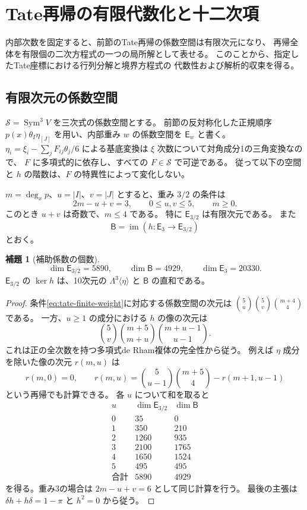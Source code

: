 \documentclass[a4paper,11pt]{ltjsarticle}
\theoremstyle{definition}
\newtheorem{lemma}[theorem]{補題}
\newcommand{\Sym}{\operatorname{Sym}}
\begin{document}
\clearpage
\section{Tate再帰の有限代数化と十二次項}
\label{sec:tate-algebraization-twelfth}
\label{sec:finite-algebraic-tate}

内部次数を固定すると、前節のTate再帰の係数空間は有限次元になり、
再帰全体を有限個の二次方程式の一つの局所解として表せる。
このことから、指定したTate座標における行列分解と境界方程式の
代数性および解析的収束を得る。

\subsection{有限次元の係数空間}

$\mathcal S=\Sym^3V$ を三次式の係数空間とする。
前節の反対称化した正規順序
$p(x)\theta_I\eta_{[J]}$ を用い、内部重み $w$ の係数空間を
$\mathsf E_w$ と書く。
$\eta_i=\xi_i-\sum_jF_{ij}\theta_j/6$ による基底変換は
$\xi$ 次数について対角成分1の三角変換なので、
$F$ に多項式的に依存し、すべての $F\in\mathcal S$ で可逆である。
従って以下の空間と $h$ の階数は、$F$ の特異性によって変化しない。

$m=\deg_xp$、$u=|I|$、$v=|J|$ とすると、重み $3/2$ の条件は
\[
 2m-u+v=3,\qquad 0\le u,v\le5,\qquad m\ge0.
 \tag{A1}\label{eq:tate-finite-weight}
\]
このとき $u+v$ は奇数で、$m\le4$ である。
特に $\mathsf E_{3/2}$ は有限次元である。
また
\[
 \mathsf B=\operatorname{im}
       (h\colon\mathsf E_3\longrightarrow\mathsf E_{3/2})
\]
とおく。

\begin{lemma}[補助係数の個数]
\label{lem:finite-tate-dimensions}
\[
 \dim\mathsf E_{3/2}=5890,\qquad
 \dim\mathsf B=4929,\qquad
 \dim\mathsf E_3=20330.
\]
$\mathsf E_{3/2}$ の $\ker h$ は、10次元の
$\Lambda^3\langle\eta\rangle$ と $\mathsf B$ の直和である。
\end{lemma}
\begin{proof}
条件\eqref{eq:tate-finite-weight}に対応する係数空間の次元は
$\binom5u\binom5v\binom{m+4}4$ である。
一方、$u\ge1$ の成分における $h$ の像の次元は
\[
 \binom5v
 \binom{m+5}{m+u}\binom{m+u-1}{u-1}.
\]
これは正の全次数を持つ多項式de Rham複体の完全性から従う。
例えば $\eta$ 成分を除いた像の次元 $r(m,u)$ は
\[
 r(m,0)=0,\qquad
 r(m,u)=\binom5{u-1}\binom{m+5}4-r(m+1,u-1)
\]
という再帰でも計算できる。
各 $u$ について和を取ると
\[
\begin{array}{c|rr}
u&\dim\mathsf E_{3/2}&\dim\mathsf B\\\hline
0&35&0\\
1&350&210\\
2&1260&935\\
3&2100&1765\\
4&1650&1524\\
5&495&495\\\hline
\text{合計}&5890&4929
\end{array}
\]
を得る。重み3の場合は $2m-u+v=6$ として同じ計算を行う。
最後の主張は $\delta h+h\delta=1-\pi$ と $h^2=0$ から従う。
\end{proof}
\end{document}
